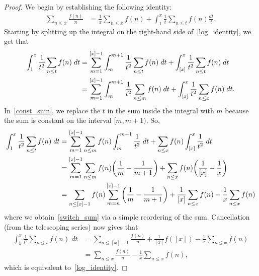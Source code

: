 \documentclass[11pt]{article}
\begin{document}
\begin{proof}
We begin by establishing the following identity:
\begin{align}
\sum_{n\leq x}\frac{f(n)}{n} &= \frac{1}{x}\sum_{n\leq x}f(n)+\int_1^x\frac{1}{t}\sum_{n\leq t}f(n)\frac{dt}{t}.\label{log_identity}
\end{align}
Starting by splitting up the integral on the right-hand side of~\eqref{log_identity}, we get that
\begin{align}
\int_1^x\frac{1}{t^2}\sum_{n\leq t}f(n)\;dt &= \sum_{m=1}^{[x]-1}\int_m^{m+1}\frac{1}{t^2}\sum_{n\leq t}f(n)\;dt+\int_{[x]}^{x}\frac{1}{t^2}\sum_{n\leq t}f(n)\;dt\notag\\
&= \sum_{m=1}^{[x]-1}\int_m^{m+1}\frac{1}{t^2}\sum_{n\leq m}f(n)\;dt+\int_{[x]}^x\frac{1}{t^2}\sum_{n\leq x}f(n)\;dt.\label{const_sum}
\end{align}
In~\eqref{const_sum}, we replace the $t$ in the sum inside the integral with $m$ because the sum is constant on the interval $[m,m+1)$. So,
\begin{align}
\int_1^x\frac{1}{t^2}\sum_{n\leq t}f(n)\;dt &= \sum_{m=1}^{[x]-1}\sum_{n\leq m}f(n)\int_m^{m+1}\frac{1}{t^2}\;dt+\sum_{n\leq x}f(n)\int_{[x]}^x\frac{1}{t^2}\;dt\notag\\
&= \sum_{m=1}^{[x]-1}\sum_{n\leq m}f(n)\bigg(\frac{1}{m}-\frac{1}{m+1}\bigg)+\sum_{n\leq x}f(n)\bigg(\frac{1}{[x]}-\frac{1}{x}\bigg)\notag\\
&= \sum_{n\leq [x]-1}f(n)\sum_{m=n}^{[x]-1}\bigg(\frac{1}{m}-\frac{1}{m+1}\bigg)+\frac{1}{[x]}\sum_{n\leq x}f(n)-\frac{1}{x}\sum_{n\leq x}f(n)\label{switch_sum}
\end{align}
where we obtain~\eqref{switch_sum} via a simple reordering of the sum. Cancellation (from the telescoping series) now gives that
\begin{align*}
\int_1^x\frac{1}{t^2}\sum_{n\leq t}f(n)\;dt &= \sum_{n\leq [x]-1}\frac{f(n)}{n}+\frac{1}{[x]}f([x])-\frac{1}{x}\sum_{n\leq x}f(n)\\
&= \sum_{n\leq x}\frac{f(n)}{n}-\frac{1}{x}\sum_{n\leq x}f(n),
\end{align*}
which is equivalent to~\eqref{log_identity}.


\end{proof}
\end{document}
